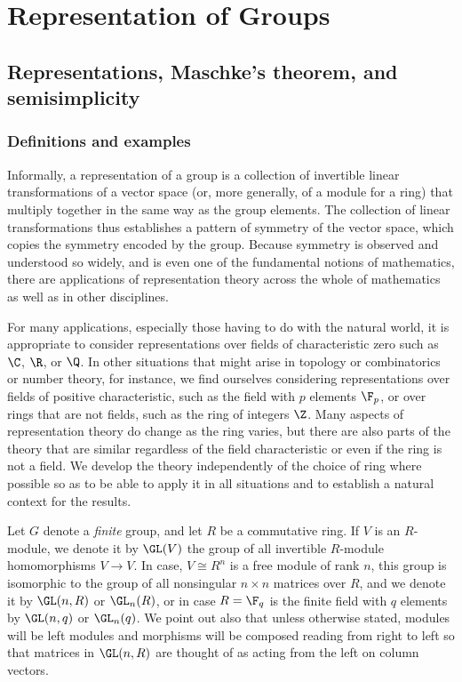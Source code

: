 
\chapter{Representation of Groups}
\section{Representations, Maschke's theorem, and semisimplicity}
\subsection{Definitions and examples}
Informally, a representation of a group is a collection of invertible linear transformations of a vector space (or, more generally, of a module for a ring) that multiply together in the same way as the group elements. The collection of linear transformations thus establishes a pattern of symmetry of the vector space, which copies the symmetry encoded by the group. Because symmetry is observed and understood so widely, and is even one of the fundamental notions of mathematics, there are applications of representation theory across the whole of mathematics as well as in other disciplines.\par
For many applications, especially those having to do with the natural world,
it is appropriate to consider representations over fields of characteristic zero such as $\C$, $\R$, or $\Q$. In other situations that might arise in topology or combinatorics or number theory, for instance, we find ourselves considering representations over fields of positive characteristic, such as the field with $p$ elements $\F_p$, or over rings that are not fields, such as the ring of integers $\Z$. Many aspects of representation theory do change as the ring varies, but there are also parts of the theory that are similar regardless of the field characteristic or even if the ring is not a field. We develop the theory independently of the choice of ring where possible so as to be able to apply it in all situations and to establish a natural context for the results.\par
Let $G$ denote a \textit{finite} group, and let $R$ be a commutative ring. If $V$ is an $R$-module, we denote it by $\GL(V)$ the group of all invertible $R$-module homomorphisms $V\to V$. In case, $V\cong R^n$ is a free module of rank $n$, this group is isomorphic to the group of all nonsingular $n\times n$ matrices over $R$, and we denote it by $\GL(n,R)$ or $\GL_n(R)$, or in case $R=\F_q$ is the finite field with $q$ elements by $\GL(n,q)$ or $\GL_n(q)$. We point out also that unless otherwise stated, modules will be left modules and morphisms will be composed reading from right to left so that matrices in $\GL(n,R)$ are thought of as acting from the left on column vectors.\par
